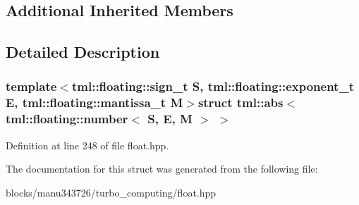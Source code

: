 \subsection*{Additional Inherited Members}


\subsection{Detailed Description}
\subsubsection*{template$<$tml\+::floating\+::sign\+\_\+t S, tml\+::floating\+::exponent\+\_\+t E, tml\+::floating\+::mantissa\+\_\+t M$>$struct tml\+::abs$<$ tml\+::floating\+::number$<$ S, E, M $>$ $>$}



Definition at line 248 of file float.\+hpp.



The documentation for this struct was generated from the following file\+:\begin{DoxyCompactItemize}
\item 
blocks/manu343726/turbo\+\_\+computing/float.\+hpp\end{DoxyCompactItemize}
